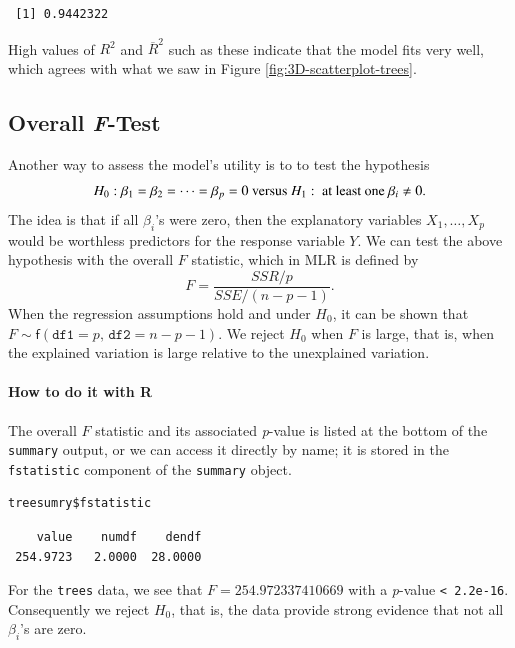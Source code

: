 \documentclass[captions=tableheading]{scrbook}
\begin{document}
\begin{verbatim}
 [1] 0.9442322
\end{verbatim}

High values of \(R^{2}\) and \( \overline{R}^2 \) such as these indicate that the model fits very well, which agrees with what we saw in Figure \ref{fig:3D-scatterplot-trees}.
\subsection{Overall \emph{F}-Test}
\label{sec-12-3-2}

\label{sub:mlr-Overall-F-Test}

Another way to assess the model's utility is to to test the hypothesis
\[
H_{0}:\beta_{1}=\beta_{2}=\cdots=\beta_{p}=0\mbox{ versus }H_{1}:\mbox{ at least one \ensuremath{\beta_{i}\neq0}}.
\]
The idea is that if all \(\beta_{i}\)'s were zero, then the explanatory variables \(X_{1},\ldots,X_{p}\) would be worthless predictors for the response variable \(Y\). We can test the above hypothesis with the overall \(F\) statistic, which in MLR is defined by
\begin{equation}
F=\frac{SSR/p}{SSE/(n-p-1)}.
\end{equation}
When the regression assumptions hold and under \(H_{0}\), it can be shown that \(F\sim\mathsf{f}(\mathtt{df1}=p,\,\mathtt{df2}=n-p-1)\). We reject \(H_{0}\) when \(F\) is large, that is, when the explained variation is large relative to the unexplained variation.

\paragraph*{How to do it with \textsf{R}}

The overall \(F\) statistic and its associated \emph{p}-value is listed at the bottom of the \texttt{summary} output, or we can access it directly by name; it is stored in the \texttt{fstatistic} component of the \texttt{summary} object. 


\begin{verbatim}
treesumry$fstatistic
\end{verbatim}

\begin{verbatim}
    value    numdf    dendf 
 254.9723   2.0000  28.0000
\end{verbatim}

For the \texttt{trees} data, we see that \( F =  254.972337410669 \) with a \emph{p}-value \texttt{< 2.2e-16}. Consequently we reject \(H_{0}\), that is, the data provide strong evidence that not all \(\beta_{i}\)'s are zero.
\end{document}

